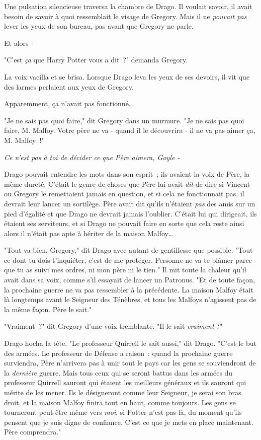 Une pulsation silencieuse traversa la chambre de Drago. Il voulait savoir, il avait besoin de savoir à quoi ressemblait le visage de Gregory. Mais il ne \emph{pouvait pas} lever les yeux de son bureau, pas avant que Gregory ne parle.

Et alors -

"C'est \emph{ça} que Harry Potter vous a dit~?" demanda Gregory.

La voix vacilla et se brisa. Lorsque Drago leva les yeux de ses devoirs, il vit que des larmes perlaient aux yeux de Gregory.

Apparemment, ça n'avait pas fonctionné.

"Je ne sais pas quoi faire," dit Gregory dans un murmure. "Je ne sais pas quoi faire, M. Malfoy. Votre père ne va - quand il le découvrira - il ne va pas aimer ça, M. Malfoy~!"

\emph{Ce n'est pas à toi de décider ce que Père aimera, Goyle -}

Drago pouvait entendre les mots dans son esprit~; ils avaient la voix de Père, la même dureté. C'était le genre de choses que Père lui avait \emph{dit} de dire si Vincent ou Gregory le remettaient jamais en question, et si cela ne fonctionnait pas, il devrait leur lancer un sortilège. Père avait dit qu'ils n'étaient \emph{pas} des amis sur un pied d'égalité et que Drago ne devrait jamais l'oublier. C'était lui qui dirigeait, ils étaient ses serviteurs, et si Drago ne pouvait faire en sorte que cela reste ainsi alors il n'était pas apte à hériter de la maison Malfoy…

"Tout va bien, Gregory," dit Drago avec autant de gentillesse que possible. "Tout ce dont tu dois t'inquiéter, c'est de me protéger. Personne ne va te blâmer parce que tu as suivi mes ordres, ni mon père ni le tien." Il mit toute la chaleur qu'il avait dans sa voix, comme s'il essayait de lancer un Patronus. "Et de toute façon, la prochaine guerre ne va pas ressembler à la précédente. La maison Malfoy était là longtemps avant le Seigneur des Ténèbres, et tous les Malfoys n'agissent pas de la même façon. Père le sait."

"Vraiment~?" dit Gregory d'une voix tremblante. "Il le sait \emph{vraiment} ?"

Drago hocha la tête. "Le professeur Quirrell le sait aussi," dit Drago. "C'est le but des armées. Le professeur de Défense a raison~: quand la prochaine guerre surviendra, Père n'arrivera pas à unir tout le pays car les gens se souviendront de la \emph{dernière} guerre. Mais tous ceux qui se seront battus dans les armées du professeur Quirrell sauront qui étaient les meilleurs généraux et ils sauront qui mérite de les mener. Ils le désigneront comme leur Seigneur, je serai son bras droit, et la maison Malfoy finira tout en haut, comme toujours. Les gens se tourneront peut-être même vers \emph{moi}, si Potter n'est pas là, du moment qu'ils pensent que je suis digne de confiance. C'est ce que je mets en place maintenant. Père comprendra."


